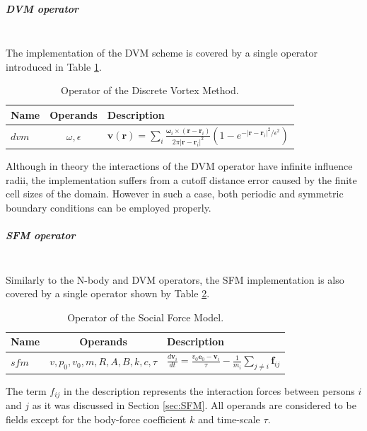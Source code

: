\documentclass[a4paper,12pt,openany]{book}
\newcommand{\mysubparagraph}[1]{\subparagraph{#1}\mbox{}\\}
\theoremstyle{break}
\begin{document}
\mysubparagraph{DVM operator}
The implementation of the DVM scheme is covered by a single operator introduced in Table \ref{tbl:DVM_op}. 
\begin{table} [h!]
\begin{center}
\caption{Operator of the Discrete Vortex Method.} \label{tbl:DVM_op}
\begin{tabular}{ l c l }
\toprule[1.5pt]
\bf Name & \bf Operands & \bf Description \\ 
\midrule
$dvm$ & $\omega, \epsilon$ & $\textbf{v}(\textbf{r})=\sum_i\frac{\bm{\omega}_i\times (\textbf{r}-\textbf{r}_i)}{2\pi \vert\textbf{r}-\textbf{r}_i\vert^2}(1-e^{-\vert\textbf{r}-\textbf{r}_i\vert^2/\epsilon^2})$ \\
\bottomrule[1.25pt]
\end{tabular}
\end{center}
\end{table}
Although in theory the interactions of the DVM operator have infinite influence radii, the implementation suffers from a cutoff distance error caused by the finite cell sizes of the domain. However in such a case, both periodic and symmetric boundary conditions can be employed properly.



\mysubparagraph{SFM operator}
Similarly to the N-body and DVM operators, the SFM implementation is also covered by a single operator shown by Table \ref{tbl:SFM_op}.
\begin{table} [h!]
\begin{center}
\caption{Operator of the Social Force Model.} \label{tbl:SFM_op}
\begin{tabular}{ l c l }
\toprule[1.5pt]
\bf Name & \bf Operands & \bf Description \\ 
\midrule
$sfm$ & $v,p_0,v_0,m,R,A,B,k,c,\tau$ & $\frac{d\textbf{v}_i}{dt}=\frac{v_0\textbf{e}_0-\textbf{v}_i}{\tau}-\frac{1}{m_i}\sum_{j\neq i}{\textbf{f}_{ij}}$ \\
\bottomrule[1.25pt]
\end{tabular}
\end{center}
\end{table}
The term $f_{ij}$ in the description represents the interaction forces between persons $i$ and $j$ as it was discussed in Section \ref{sec:SFM}. All operands are considered to be fields except for the body-force coefficient $k$ and time-scale $\tau$.
\end{document}
